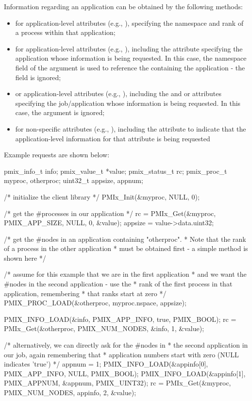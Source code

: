 
Information regarding an application can be obtained by the following methods:

\begin{itemize}
\item for application-level attributes (e.g., ), specifying the namespace and rank of a process within that application;
\item for application-level attributes (e.g., ), including the  attribute specifying the application whose information is being requested. In this case, the namespace field of the  argument is used to reference the  containing the application - the  field is ignored;
\item or application-level attributes (e.g., ), including the  and  or  attributes specifying the job/application whose information is being requested. In this case, the  argument is ignored;
\item for non-specific attributes (e.g., ), including the  attribute to indicate that the application-level information for that attribute is being requested
\end{itemize}

Example requests are shown below:

\cspecificstart
\begin{codepar}
pmix_info_t info;
pmix_value_t *value;
pmix_status_t rc;
pmix_proc_t myproc, otherproc;
uint32_t appsize, appnum;

/* initialize the client library */
PMIx_Init(&myproc, NULL, 0);

/* get the #processes in our application */
rc = PMIx_Get(&myproc, PMIX_APP_SIZE, NULL, 0, &value);
appsize = value->data.uint32;

/* get the #nodes in an application containing "otherproc".
 * Note that the rank of a process in the other application
 * must be obtained first - a simple method is shown here */

/* assume for this example that we are in the first application
 * and we want the #nodes in the second application - use the
 * rank of the first process in that application, remembering
 * that ranks start at zero */
PMIX_PROC_LOAD(&otherproc, myproc.nspace, appsize);

PMIX_INFO_LOAD(&info, PMIX_APP_INFO, true, PMIX_BOOL);
rc = PMIx_Get(&otherproc, PMIX_NUM_NODES, &info, 1, &value);

/* alternatively, we can directly ask for the #nodes in
 * the second application in our job, again remembering that
 * application numbers start with zero (NULL indicates 'true') */
appnum = 1;
PMIX_INFO_LOAD(&appinfo[0], PMIX_APP_INFO, NULL, PMIX_BOOL);
PMIX_INFO_LOAD(&appinfo[1], PMIX_APPNUM, &appnum, PMIX_UINT32);
rc = PMIx_Get(&myproc, PMIX_NUM_NODES, appinfo, 2, &value);

\end{codepar}
\cspecificend

